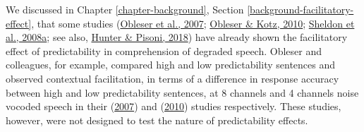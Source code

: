 \documentclass[a4paper, nobind]{templates/ociamthesis}
\begin{document}
\noindent
We discussed in Chapter \ref{chapter-background}, Section \ref{background-facilitatory-effect},
that some studies (\protect\hyperlink{ref-Obleser2007}{Obleser et al., 2007}; \protect\hyperlink{ref-Obleser2010}{Obleser \& Kotz, 2010}; \protect\hyperlink{ref-Sheldon2008a}{Sheldon et al., 2008a}; see also, \protect\hyperlink{ref-Hunter2018}{Hunter \& Pisoni, 2018}) have already shown the facilitatory effect of predictability in comprehension of degraded speech.
Obleser and colleagues, for example, compared high and low predictability sentences and observed contextual facilitation, in terms of a difference in response accuracy between high and low predictability sentences, at 8 channels and 4 channels noise vocoded speech in their (\protect\hyperlink{ref-Obleser2007}{2007}) and (\protect\hyperlink{ref-Obleser2010}{2010}) studies respectively.
These studies, however, were not designed to test the nature of predictability effects.
\end{document}
